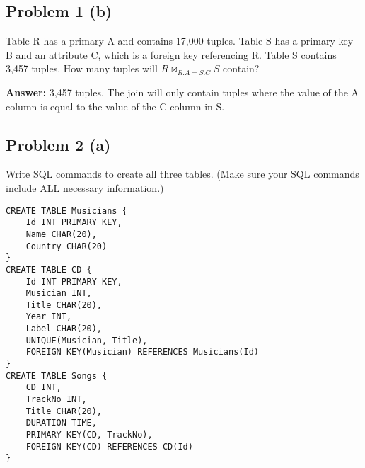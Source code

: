 \documentclass{article}
\begin{document}
\subsection*{Problem 1 (b)}
Table R has a primary A and contains 17,000 tuples. Table S has a primary key
B and an attribute C, which is a foreign key referencing R. Table S contains 
3,457 tuples. How many tuples will $R\bowtie_{R.A=S.C}S$ contain? \newline

\textbf{Answer:} 3,457 tuples. The join will only contain tuples where the
value of the A column is equal to the value of the C column in S.

\subsection*{Problem 2 (a)}
Write SQL commands to create all three tables. (Make sure your SQL commands
include ALL necessary information.)

\begin{verbatim}
CREATE TABLE Musicians {
    Id INT PRIMARY KEY,
    Name CHAR(20),
    Country CHAR(20)
}
CREATE TABLE CD {
    Id INT PRIMARY KEY,
    Musician INT,
    Title CHAR(20),
    Year INT,
    Label CHAR(20),
    UNIQUE(Musician, Title),
    FOREIGN KEY(Musician) REFERENCES Musicians(Id)
}
CREATE TABLE Songs {
    CD INT,
    TrackNo INT,
    Title CHAR(20),
    DURATION TIME,
    PRIMARY KEY(CD, TrackNo),
    FOREIGN KEY(CD) REFERENCES CD(Id)
}
\end{verbatim}
\end{document}
